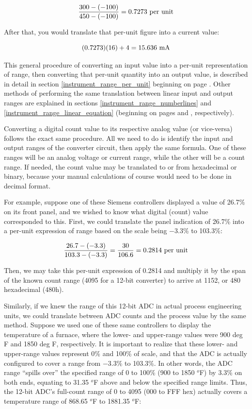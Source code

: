 $${300 - (-100) \over 450 - (-100)} = 0.7273 \hbox{ per unit}$$

After that, you would translate that per-unit figure into a current value:

$$(0.7273)(16) + 4 = 15.636 \hbox{ mA}$$

This general procedure of converting an input value into a per-unit representation of range, then converting that per-unit quantity into an output value, is described in detail in section \ref{instrument_range_per_unit} beginning on page \pageref{instrument_range_per_unit}.  Other methods of performing the same translation between linear input and output ranges are explained in sections \ref{instrument_range_numberlines} and \ref{instrument_range_linear_equation} (beginning on pages \pageref{instrument_range_numberlines} and \pageref{instrument_range_linear_equation}, respectively).

Converting a digital count value to its respective analog value (or vice-versa) follows the exact same procedure.  All we need to do is identify the input and output ranges of the converter circuit, then apply the same formula.  One of these ranges will be an analog voltage or current range, while the other will be a count range.  If needed, the count value may be translated to or from hexadecimal or binary, because your manual calculations of course would need to be done in decimal format.

\filbreak

For example, suppose one of these Siemens controllers displayed a value of 26.7\% on its front panel, and we wished to know what digital (count) value corresponded to this.  First, we could translate the panel indication of 26.7\% into a per-unit expression of range based on the scale being $-3.3$\% to 103.3\%:

$${{26.7 - (-3.3)} \over {103.3 - (-3.3)}} = {30 \over 106.6} = 0.2814 \hbox{ per unit}$$

Then, we may take this per-unit expression of 0.2814 and multiply it by the span of the known count range (4095 for a 12-bit converter) to arrive at 1152, or 480 hexadecimal (480h).

\vskip 10pt

Similarly, if we knew the range of this 12-bit ADC in actual process engineering units, we could translate between ADC counts and the process value by the same method.  Suppose we used one of these same controllers to display the temperature of a furnace, where the lower- and upper-range values were 900 deg F and 1850 deg F, respectively.  It is important to realize that these lower- and upper-range values represent 0\% and 100\% of scale, and that the ADC is actually configured to cover a range from $-3.3$\% to 103.3\%.  In other words, the ADC range ``spills over'' the specified range of 0 to 100\% (900 to 1850 $^{o}$F) by 3.3\% on both ends, equating to 31.35 $^{o}$F above and below the specified range limits.  Thus, the 12-bit ADC's full-count range of 0 to 4095 (000 to FFF hex) actually covers a temperature range of 868.65 $^{o}$F to 1881.35 $^{o}$F:


